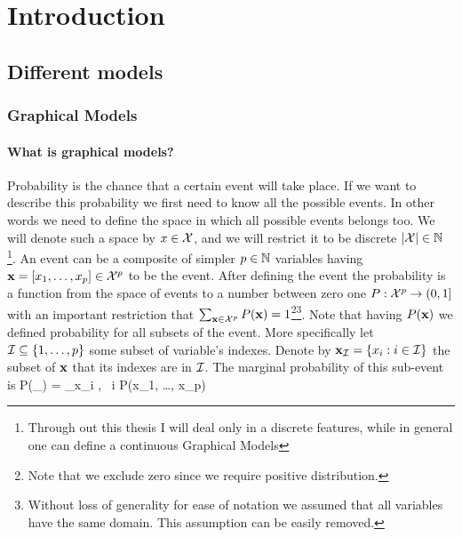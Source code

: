 
\chapter{Introduction} %

\label{intro} %


\newcommand{\keyword}[1]{\textbf{#1}}
\newcommand{\tabhead}[1]{\textbf{#1}}
\newcommand{\code}[1]{\texttt{#1}}
\newcommand{\file}[1]{\texttt{\bfseries#1}}
\newcommand{\option}[1]{\texttt{\itshape#1}}

\section{Different models}
\subsection{Graphical Models}
\subsubsection{What is graphical models?}
Probability is the chance that a certain event will take place.
If we want to describe this probability we first need to know all the possible events.
In other words we need to define the space in which all possible events belongs too.
We will denote such a space by $x \in {\cal X}$, and we will restrict it to be discrete $ |{\cal X}| \in \mathbb{N}$
\footnote{Through out this thesis I will deal only in a discrete features, while in general one can define a continuous Graphical Models}.
An event can be a composite of simpler $p \in \mathbb{N}$ variables having ${\bf x} = [x_1, \ldots, x_{p}] \in {\cal X}^p$ to be the event.
After defining the event the probability is  a function from the space of events to a number between zero one $P:{\cal X}^{p} \to (0,1]$ with an important restriction that $\sum_{{\bf x} \in {\cal X}^{p}} P({\bf x}) = 1$\footnote{Note that we exclude zero since we require positive distribution.}\footnote{Without loss of generality for ease of notation we assumed that all variables have the same domain. This assumption can be easily removed.}.
Note that having $P({\bf x})$ we defined probability for all subsets of the event.
More specifically let $ {\cal I} \subseteq \{1, \ldots,p\}$ some subset of variable's indexes. Denote by ${\bf x}_{{\cal I}} = \{x_i : i \in {\cal I}\}$ the subset of ${\bf x}$ that its indexes are in ${\cal I}$.  
The marginal probability of this sub-event is 
\be
\label{eq:MAR}
P(\xx_{\cI}) = \sum_{x_i \in \cX, \forall\ i \in [1,\ldots p] \setminus \cI} P(x_1, \ldots, x_p)
\ee


